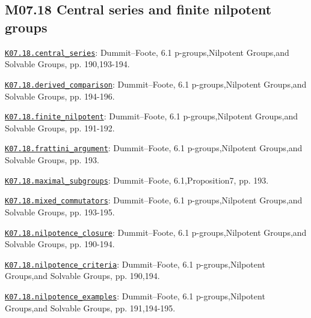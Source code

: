 \subsection*{M07.18 Central series and finite nilpotent groups}
\par\smallskip\noindent\hypertarget{src:K07.18.central_series}{}\label{src:K07.18.central_series}\hyperref[K07.18.central_series]{\texttt{K07.18.central\_series}}: Dummit--Foote, 6.1 p-groups,Nilpotent Groups,and Solvable Groups, pp. 190,193-194.
\par\smallskip\noindent\hypertarget{src:K07.18.derived_comparison}{}\label{src:K07.18.derived_comparison}\hyperref[K07.18.derived_comparison]{\texttt{K07.18.derived\_comparison}}: Dummit--Foote, 6.1 p-groups,Nilpotent Groups,and Solvable Groups, pp. 194-196.
\par\smallskip\noindent\hypertarget{src:K07.18.finite_nilpotent}{}\label{src:K07.18.finite_nilpotent}\hyperref[K07.18.finite_nilpotent]{\texttt{K07.18.finite\_nilpotent}}: Dummit--Foote, 6.1 p-groups,Nilpotent Groups,and Solvable Groups, pp. 191-192.
\par\smallskip\noindent\hypertarget{src:K07.18.frattini_argument}{}\label{src:K07.18.frattini_argument}\hyperref[K07.18.frattini_argument]{\texttt{K07.18.frattini\_argument}}: Dummit--Foote, 6.1 p-groups,Nilpotent Groups,and Solvable Groups, pp. 193.
\par\smallskip\noindent\hypertarget{src:K07.18.maximal_subgroups}{}\label{src:K07.18.maximal_subgroups}\hyperref[K07.18.maximal_subgroups]{\texttt{K07.18.maximal\_subgroups}}: Dummit--Foote, 6.1,Proposition7, pp. 193.
\par\smallskip\noindent\hypertarget{src:K07.18.mixed_commutators}{}\label{src:K07.18.mixed_commutators}\hyperref[K07.18.mixed_commutators]{\texttt{K07.18.mixed\_commutators}}: Dummit--Foote, 6.1 p-groups,Nilpotent Groups,and Solvable Groups, pp. 193-195.
\par\smallskip\noindent\hypertarget{src:K07.18.nilpotence_closure}{}\label{src:K07.18.nilpotence_closure}\hyperref[K07.18.nilpotence_closure]{\texttt{K07.18.nilpotence\_closure}}: Dummit--Foote, 6.1 p-groups,Nilpotent Groups,and Solvable Groups, pp. 190-194.
\par\smallskip\noindent\hypertarget{src:K07.18.nilpotence_criteria}{}\label{src:K07.18.nilpotence_criteria}\hyperref[K07.18.nilpotence_criteria]{\texttt{K07.18.nilpotence\_criteria}}: Dummit--Foote, 6.1 p-groups,Nilpotent Groups,and Solvable Groups, pp. 190,194.
\par\smallskip\noindent\hypertarget{src:K07.18.nilpotence_examples}{}\label{src:K07.18.nilpotence_examples}\hyperref[K07.18.nilpotence_examples]{\texttt{K07.18.nilpotence\_examples}}: Dummit--Foote, 6.1 p-groups,Nilpotent Groups,and Solvable Groups, pp. 191,194-195.
